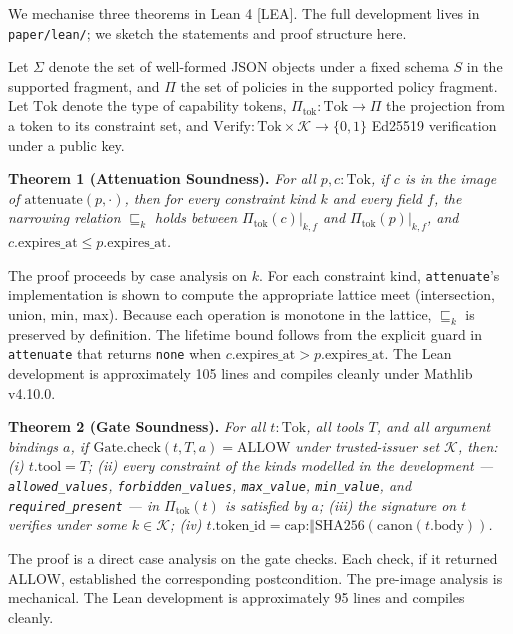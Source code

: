 We mechanise three theorems in Lean 4 {[}LEA{]}. The full development
lives in \texttt{paper/lean/}; we sketch the statements and proof
structure here.

Let \(\Sigma\) denote the set of well-formed JSON objects under a fixed
schema \(S\) in the supported fragment, and \(\Pi\) the set of policies
in the supported policy fragment. Let \(\text{Tok}\) denote the type of
capability tokens, \(\Pi_\text{tok}: \text{Tok} \to \Pi\) the projection
from a token to its constraint set, and
\(\text{Verify}: \text{Tok} \times \mathcal{K} \to \{0, 1\}\) Ed25519
verification under a public key.

\textbf{Theorem 1 (Attenuation Soundness).} \emph{For all
\(p, c : \text{Tok}\), if \(c\) is in the image of
\(\text{attenuate}(p, \cdot)\), then for every constraint kind \(k\) and
every field \(f\), the narrowing relation \(\sqsubseteq_k\) holds
between \(\Pi_\text{tok}(c)|_{k,f}\) and \(\Pi_\text{tok}(p)|_{k,f}\),
and \(c.\text{expires\_at} \le p.\text{expires\_at}\).}

The proof proceeds by case analysis on \(k\). For each constraint kind,
\texttt{attenuate}'s implementation is shown to compute the appropriate
lattice meet (intersection, union, min, max). Because each operation is
monotone in the lattice, \(\sqsubseteq_k\) is preserved by definition.
The lifetime bound follows from the explicit guard in \texttt{attenuate}
that returns \texttt{none} when
\(c.\text{expires\_at} > p.\text{expires\_at}\). The Lean development is
approximately 105 lines and compiles cleanly under Mathlib v4.10.0.

\textbf{Theorem 2 (Gate Soundness).} \emph{For all \(t : \text{Tok}\),
all tools \(T\), and all argument bindings \(a\), if
\(\text{Gate.check}(t, T, a) = \text{ALLOW}\) under trusted-issuer set
\(\mathcal{K}\), then: (i) \(t.\text{tool} = T\); (ii) every constraint
of the kinds modelled in the development --- \texttt{allowed\_values},
\texttt{forbidden\_values}, \texttt{max\_value}, \texttt{min\_value},
and \texttt{required\_present} --- in \(\Pi_\text{tok}(t)\) is satisfied
by \(a\); (iii) the signature on \(t\) verifies under some
\(k \in \mathcal{K}\); (iv)
\(t.\text{token\_id} = \text{cap:}\Vert\text{SHA256}(\text{canon}(t.\text{body}))\).}

The proof is a direct case analysis on the gate checks. Each check, if
it returned ALLOW, established the corresponding postcondition. The
pre-image analysis is mechanical. The Lean development is approximately
95 lines and compiles cleanly.

